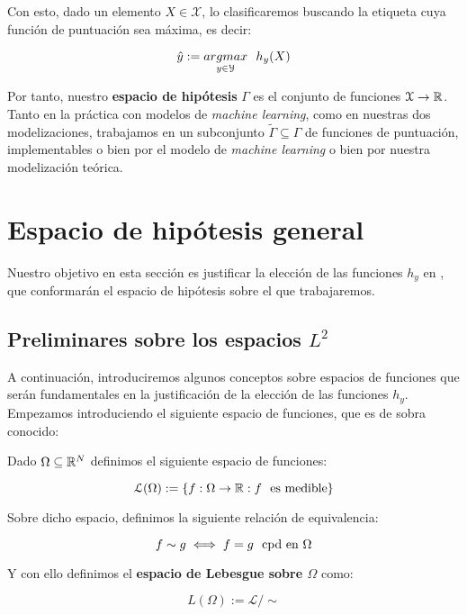 Con esto, dado un elemento $X \in \mathcal{X}$, lo clasificaremos buscando la etiqueta cuya función de puntuación sea máxima, es decir:

$$\hat{y} := \underset{y \in \mathcal{Y}}{argmax} \ \  h_y(X)$$

Por tanto, nuestro \textbf{espacio de hipótesis} $\Gamma$ es el conjunto de funciones $\mathcal{X} \to \mathbb{R}$. Tanto en la práctica con modelos de \textit{machine learning}, como en nuestras dos modelizaciones, trabajamos en un subconjunto $\tilde{\Gamma} \subseteq \Gamma$ de funciones de puntuación, implementables o bien por el modelo de \textit{machine learning} o bien por nuestra modelización teórica.

\section{Espacio de hipótesis general}

Nuestro objetivo en esta sección es justificar la elección de las funciones $h_y$ en , que conformarán el espacio de hipótesis sobre el que trabajaremos.

\subsection{Preliminares sobre los espacios $L^2$} \label{sec:preliminares_funcional}

A continuación, introduciremos algunos conceptos sobre espacios de funciones que serán fundamentales en la justificación de la elección de las funciones $h_y$. Empezamos introduciendo el siguiente espacio de funciones, que es de sobra conocido:

\begin{definicion}

    Dado $\Omega \subseteq \mathbb{R}^N$ definimos el siguiente espacio de funciones:

    \begin{equation}
        \mathcal{L}(\Omega) := \{f: \Omega \to \mathbb{R} : f \ \  \text{es medible} \}
    \end{equation}

    Sobre dicho espacio, definimos la siguiente relación de equivalencia:

    \begin{equation}
        f \sim g \iff f = g \ \  \text{cpd en } \Omega
    \end{equation}

    Y con ello definimos el \textbf{espacio de Lebesgue sobre $\Omega$} como:

    \begin{equation}
        L(\Omega) := \mathcal{L} / \sim
    \end{equation}
\end{definicion}

